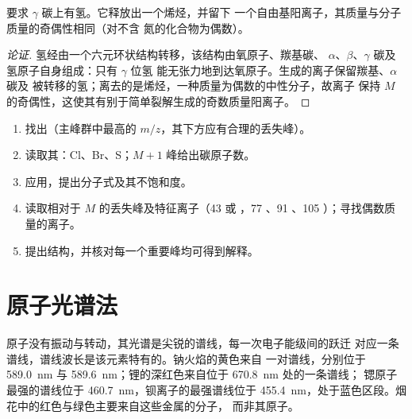 \begin{proposition}[麦氏重排的条件]\label{prop:b2:mass-spec-atomic:mclafferty}
要求 $\gamma$ 碳上有氢。它释放出一个烯烃，并留下
一个自由基阳离子，其质量与分子质量的奇偶性相同（对不含
氮的化合物为偶数）。
\end{proposition}

\begin{proof}[论证]
氢经由一个六元环状结构转移，该结构由氧原子、羰基碳、
$\alpha$、$\beta$、$\gamma$ 碳及氢原子自身组成：只有 $\gamma$ 位氢
能无张力地到达氧原子。生成的离子保留羰基、$\alpha$ 碳及
被转移的氢；离去的是烯烃，一种质量为偶数的中性分子，故离子
保持 $M$ 的奇偶性，这使其有别于简单裂解生成的奇数质量阳离子。
\end{proof}

\begin{method}[读取质谱图]\label{met:b2:mass-spec-atomic:read-ms}
\begin{enumerate}
  \item 找出（主峰群中最高的 $m/z$，其下方应有合理的丢失峰）。
  \item 读取其：Cl、Br、S；$M+1$ 峰给出碳原子数。
  \item 应用，提出分子式及其不饱和度。
  \item 读取相对于 $M$ 的丢失峰及特征离子（43  或 ，77
        、91 、105 ）；寻找偶数质量的离子。
  \item 提出结构，并核对每一个重要峰均可得到解释。
\end{enumerate}
\end{method}

\section{原子光谱法}

原子没有振动与转动，其光谱是尖锐的谱线，每一次电子能级间的跃迁
对应一条谱线，谱线波长是该元素特有的。钠火焰的黄色来自
一对谱线，分别位于 \qty{589.0}{nm} 与 \qty{589.6}{nm}；锂的深红色来自位于 \qty{670.8}{nm} 处的一条谱线；
锶原子最强的谱线位于 \qty{460.7}{nm}，钡离子的最强谱线位于
\qty{455.4}{nm}，处于蓝色区段。烟花中的红色与绿色主要来自这些金属的分子，
而非其原子。

